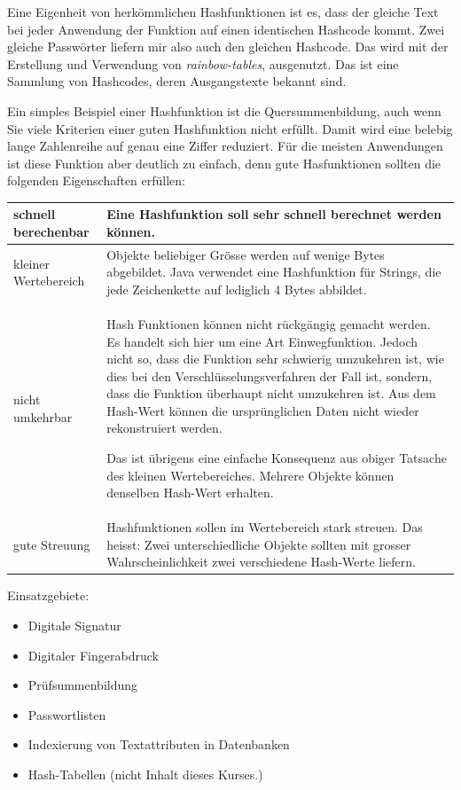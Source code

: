 Eine Eigenheit von herkömmlichen Hashfunktionen ist es, dass der
gleiche Text bei jeder Anwendung der Funktion auf einen identischen
Hashcode kommt. Zwei gleiche Passwörter liefern mir also auch den
gleichen Hashcode. Das wird mit der Erstellung und Verwendung von
\emph{rainbow-tables}, ausgenutzt. Das ist eine Sammlung von
Hashcodes, deren Ausgangstexte bekannt sind.

Ein simples Beispiel einer Hashfunktion ist die Quersummenbildung,
auch wenn Sie viele Kriterien einer guten Hashfunktion nicht
erfüllt. Damit wird eine belebig lange Zahlenreihe auf genau
eine Ziffer reduziert. Für die meisten Anwendungen ist diese
Funktion aber deutlich zu einfach, denn gute Hasfunktionen sollten
die folgenden Eigenschaften erfüllen:

\begin{tabular}{p{}|p{}}
    \hline
    schnell berechenbar &
    Eine Hashfunktion soll sehr schnell berechnet werden können. \\ \hline

    kleiner Wertebereich &
    Objekte beliebiger Grösse werden auf wenige Bytes abgebildet. Java
    verwendet eine Hashfunktion für Strings, die jede Zeichenkette
    auf lediglich 4 Bytes abbildet. \\ \hline

    nicht umkehrbar &
    Hash Funktionen können nicht rückgängig gemacht werden. Es handelt
    sich hier um eine Art Einwegfunktion. Jedoch nicht so, dass die
    Funktion sehr schwierig umzukehren ist, wie dies bei den
    Verschlüsselungsverfahren der Fall ist, sondern, dass die
    Funktion überhaupt nicht umzukehren ist. Aus dem Hash-Wert
    können die ursprünglichen Daten nicht wieder rekonstruiert werden.

    Das ist übrigens eine einfache Konsequenz aus obiger Tatsache
    des kleinen Wertebereiches. Mehrere Objekte können denselben
    Hash-Wert erhalten. \\ \hline

    gute Streuung &
    Hashfunktionen sollen im Wertebereich stark streuen. Das heisst:
    Zwei unterschiedliche Objekte sollten mit grosser Wahrscheinlichkeit
    zwei verschiedene Hash-Werte liefern. \\ \hline
\end{tabular}

Einsatzgebiete:
\begin{itemize}
    \item Digitale Signatur 
    \item Digitaler Fingerabdruck
    \item Prüfsummenbildung
    \item Passwortlisten 
    \item Indexierung von Textattributen in Datenbanken
    \item Hash-Tabellen (nicht Inhalt dieses Kurses.)
\end{itemize}

